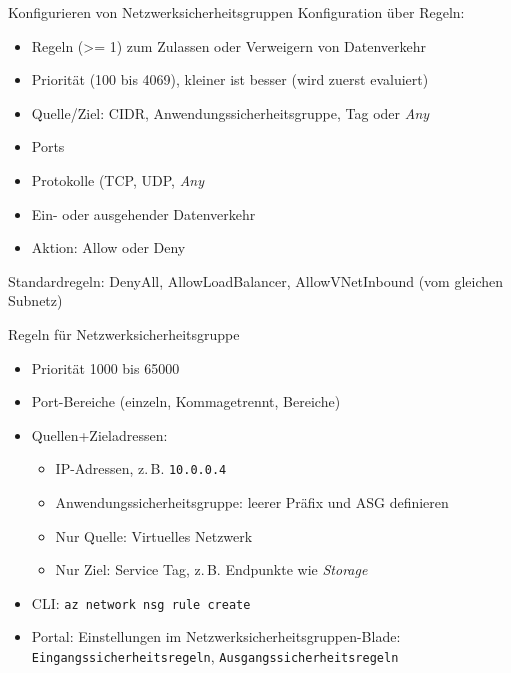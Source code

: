 \begin{flashcard}[Definition]{Konfigurieren von Netzwerksicherheitsgruppen}
    Konfiguration über Regeln:
    \begin{itemize}
        \item Regeln (>= 1) zum Zulassen oder Verweigern von Datenverkehr
        \item Priorität (100 bis 4069), kleiner ist besser (wird zuerst evaluiert)
        \item Quelle/Ziel: CIDR, Anwendungssicherheitsgruppe, Tag oder \emph{Any}
        \item Ports
        \item Protokolle (TCP, UDP, \emph{Any}
        \item Ein- oder ausgehender Datenverkehr
        \item Aktion: Allow oder Deny
    \end{itemize}
    Standardregeln: DenyAll, AllowLoadBalancer, AllowVNetInbound (vom gleichen Subnetz)
\end{flashcard}

\begin{flashcard}[Definition]{Regeln für Netzwerksicherheitsgruppe}
    \begin{itemize}
        \item Priorität 1000 bis 65000
        \item Port-Bereiche (einzeln, Kommagetrennt, Bereiche)
        \item Quellen+Zieladressen:
        \begin{itemize}
            \item IP-Adressen, z.\,B. \texttt{10.0.0.4}
            \item Anwendungssicherheitsgruppe: leerer Präfix und ASG definieren
            \item Nur Quelle: Virtuelles Netzwerk
            \item Nur Ziel: Service Tag, z.\,B. Endpunkte wie \emph{Storage}
        \end{itemize}
        \item CLI: \texttt{az network nsg rule create}
        \item Portal: Einstellungen im Netzwerksicherheitsgruppen-Blade:\newline
            \texttt{Eingangssicherheitsregeln}, \texttt{Ausgangssicherheitsregeln}
    \end{itemize}
\end{flashcard}

